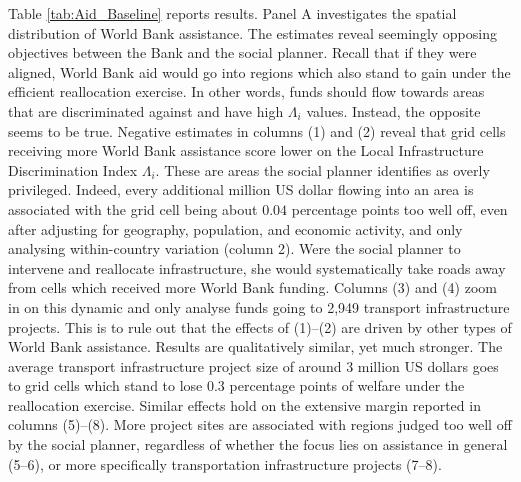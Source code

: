 \documentclass[11pt, oneside]{article}   	%
\begin{document}
Table \eqref{tab:Aid_Baseline} reports results. Panel A investigates the spatial distribution of World Bank assistance. The estimates reveal seemingly opposing objectives between the Bank and the social planner. Recall that if they were aligned, World Bank aid would go into regions which also stand to gain under the efficient reallocation exercise. In other words, funds should flow towards areas that are discriminated against and have high $\Lambda_{i}$ values. Instead, the opposite seems to be true. Negative estimates in columns (1) and (2) reveal that grid cells receiving more World Bank assistance score lower on the Local Infrastructure Discrimination Index $\Lambda_{i}$. These are areas the social planner identifies as overly privileged. Indeed, every additional million US dollar flowing into an area is associated with the grid cell being about $0.04$ percentage points too well off, even after adjusting for geography, population, and economic activity, and only analysing within-country variation (column 2). Were the social planner to intervene and reallocate infrastructure, she would systematically take roads away from cells which received more World Bank funding. Columns (3) and (4) zoom in on this dynamic and only analyse funds going to 2,949 transport infrastructure projects. This is to rule out that the effects of (1)--(2) are driven by other types of World Bank assistance. Results are qualitatively similar, yet much stronger. The average transport infrastructure project size of around 3 million US dollars goes to grid cells which stand to lose $0.3$ percentage points of welfare under the reallocation exercise. Similar effects hold on the extensive margin reported in columns (5)--(8). More project sites are associated with regions judged too well off by the social planner, regardless of whether the focus lies on assistance in general (5--6), or more specifically transportation infrastructure projects (7--8).
\end{document}
